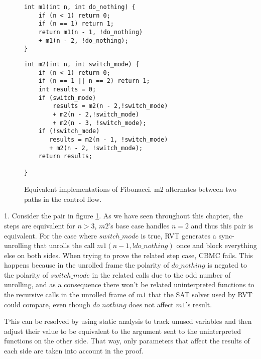 \begin{figure}[h]
\begin{center}
\begin{minipage}{7 cm}
\begin{lstlisting}
int m1(int n, int do_nothing) {
    if (n < 1) return 0;
    if (n == 1) return 1;
    return m1(n - 1, !do_nothing) 
    + m1(n - 2, !do_nothing);
}
\end{lstlisting}
\end{minipage}
\begin{minipage}{7 cm}
\begin{lstlisting}
int m2(int n, int switch_mode) {
    if (n < 1) return 0;
    if (n == 1 || n == 2) return 1;
    int results = 0;
    if (switch_mode)
        results = m2(n - 2,!switch_mode) 
        + m2(n - 2,!switch_mode) 
        + m2(n - 3, !switch_mode);
    if (!switch_mode)
       results = m2(n - 1, !switch_mode) 
       + m2(n - 2, !switch_mode);
    return results;

}
\end{lstlisting}
\end{minipage}
\caption{Equivalent implementations of Fibonacci. m2 alternates between two paths in the control flow.}
\label{fig:f1f2switch}
\end{center}
\end{figure}


1. Consider the pair in figure \ref{fig:f1f2switch}. As we have seen throughout this chapter, the steps are equivalent for $n > 3$, $m2$'s base case handles $n=2$ and thus this pair is equivalent. For the case where $switch\_mode$ is true, RVT generates a sync-unrolling that unrolls the call $m1(n-1,!do\_nothing)$ once and block everything else on both sides. When trying to prove the related step case, CBMC fails. This happens because in the unrolled frame the polarity of $do\_nothing$ is negated to the polarity of $switch\_mode$ in the related calls due to the odd number of unrolling, and as a consequence there won't be related uninterpreted functions to the recursive calls in the unrolled frame of $m1$ that the SAT solver used by RVT could compare, even though $do\_nothing$ does not affect $m1$'s result.

Tיhis can be resolved by using static analysis to track unused variables and then adjust their value to be equivalent to the argument sent to the uninterpreted functions on the other side. That way, only parameters that affect the results of each side are taken into account in the proof.


